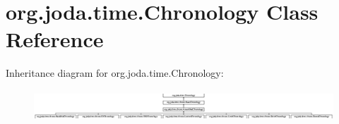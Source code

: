 \hypertarget{classorg_1_1joda_1_1time_1_1_chronology}{\section{org.\-joda.\-time.\-Chronology Class Reference}
\label{classorg_1_1joda_1_1time_1_1_chronology}
}
Inheritance diagram for org.\-joda.\-time.\-Chronology\-:\begin{figure}[H]
\begin{center}
\leavevmode
\includegraphics[height=1.194030cm]{classorg_1_1joda_1_1time_1_1_chronology}
\end{center}
\end{figure}
